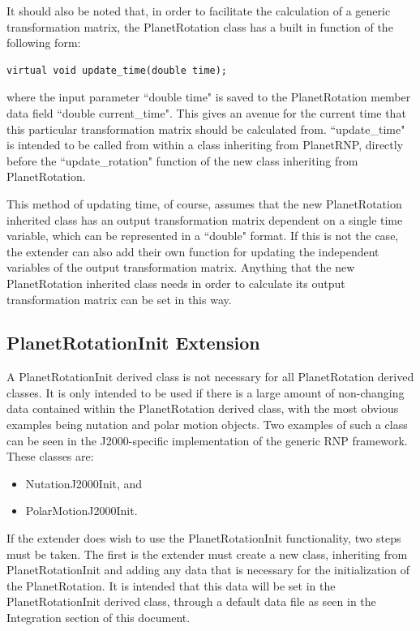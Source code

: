 It should also be noted that, in order to facilitate the 
calculation of a generic transformation matrix, 
the PlanetRotation class has a built in function of the following form:

\begin{verbatim}
virtual void update_time(double time);
\end{verbatim}

where the input parameter ``double time" is saved to the 
PlanetRotation member data field
``double current\_time". This gives an avenue
for the current time that this particular transformation matrix should be
calculated from. ``update\_time" is intended to be called from within a class
inheriting from PlanetRNP, directly before the ``update\_rotation" function
of the new class inheriting from PlanetRotation.

This method of updating time, of course, assumes that the new 
PlanetRotation inherited class has an output transformation matrix dependent
on a single time variable, which can be represented in a ``double" format.
If this is not the case, the extender can also add their own function for
updating the independent variables of the output transformation matrix.
Anything that the new PlanetRotation inherited class needs in order to
calculate its output transformation matrix can be set in this way.

\subsection{PlanetRotationInit Extension}

A PlanetRotationInit derived class is not necessary for all PlanetRotation
derived classes. It is only intended to be used if there is a large amount of
non-changing data contained within the PlanetRotation derived class, with
the most obvious examples being nutation and polar motion objects. Two
examples of such a class can be seen in the J2000-specific implementation
of the generic RNP framework. These classes are:

\begin{itemize}
\item{NutationJ2000Init}, and
\item{PolarMotionJ2000Init}.
\end{itemize}

If the extender does wish to use the PlanetRotationInit functionality, two
steps must be taken. The first is the extender must create a new class,
inheriting from PlanetRotationInit and adding any data that is necessary
for the initialization of the PlanetRotation. It is intended that this data
will be set in the PlanetRotationInit derived class, through a default data
file as seen in the Integration section of this document.

